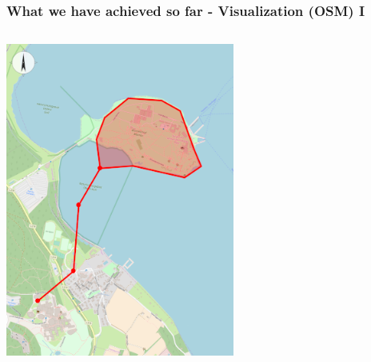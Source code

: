 \documentclass[xcolor=dvipsnames]{beamer}
\begin{document}
\begin{frame}
	\frametitle{What we have achieved so far - Visualization (OSM) I}
	\begin{columns}
	\begin{column}{0.5\textwidth}
		\includegraphics[width=\textwidth]{VisualizationFunctional.png}
	\end{column}
	\begin{column}{0.5\textwidth}

\end{column}
\end{columns}
\end{frame}
\end{document}
